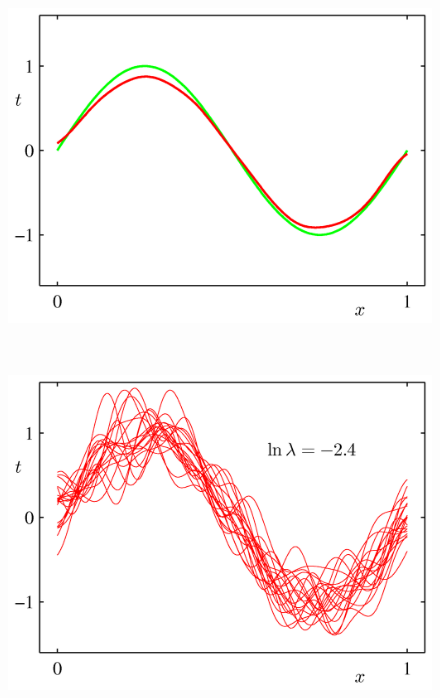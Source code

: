 \documentclass[b5paper]{book}
\numberwithin{equation}{chapter}
\begin{document}
{\begin{figure}[H]
\begin{minipage}[t]{0.5\linewidth}
		\label{fig:3-5c}
		\end{minipage}
		\begin{minipage}[t]{0.5\linewidth}
		\centering
		\includegraphics[scale=0.8]{Images/3-5d.png}
		\label{fig:3-5d}
		\end{minipage}\\
		\begin{minipage}[t]{0.5\linewidth}
		\centering
		\includegraphics[scale=0.8]{Images/3-5e.png}
		\label{fig:3-5e}
		\end{minipage}
		\begin{minipage}[t]{0.5\linewidth}
		\centering

\end{minipage}
\end{figure}}
\end{document}
